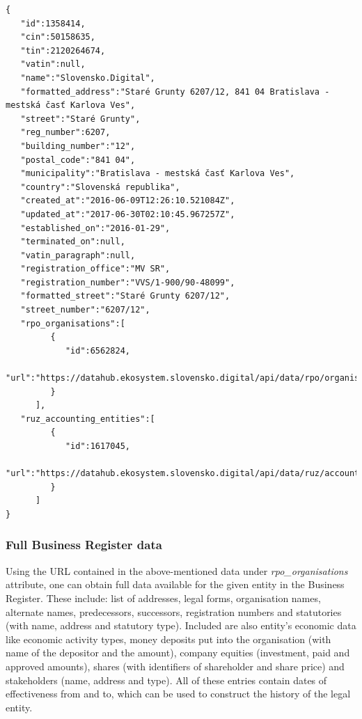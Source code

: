 \documentclass[thesis=B,english]{FITthesis}[2012/06/26]
\begin{document}
\begin{lstlisting}
{
   "id":1358414,
   "cin":50158635,
   "tin":2120264674,
   "vatin":null,
   "name":"Slovensko.Digital",
   "formatted_address":"Staré Grunty 6207/12, 841 04 Bratislava - mestská časť Karlova Ves",
   "street":"Staré Grunty",
   "reg_number":6207,
   "building_number":"12",
   "postal_code":"841 04",
   "municipality":"Bratislava - mestská časť Karlova Ves",
   "country":"Slovenská republika",
   "created_at":"2016-06-09T12:26:10.521084Z",
   "updated_at":"2017-06-30T02:10:45.967257Z",
   "established_on":"2016-01-29",
   "terminated_on":null,
   "vatin_paragraph":null,
   "registration_office":"MV SR",
   "registration_number":"VVS/1-900/90-48099",
   "formatted_street":"Staré Grunty 6207/12",
   "street_number":"6207/12",
   "rpo_organisations":[
         {
            "id":6562824,
            "url":"https://datahub.ekosystem.slovensko.digital/api/data/rpo/organisations/6562824"
         }
      ],
   "ruz_accounting_entities":[
         {
            "id":1617045,
            "url":"https://datahub.ekosystem.slovensko.digital/api/data/ruz/accounting_entities/1617045"
         }
      ]
}
\end{lstlisting}

\subsubsection{Full Business Register data}
	Using the URL contained in the above-mentioned data under \emph{rpo\_organisations} attribute, one can obtain full data available for the given entity in the Business Register. These include: list of addresses, legal forms, organisation names, alternate names, predecessors, successors, registration numbers and statutories (with name, address and statutory type). Included are also entity's economic data like economic activity types, money deposits put into the organisation (with name of the depositor and the amount), company equities (investment, paid and approved amounts), shares (with identifiers of shareholder and share price) and stakeholders (name, address and type). All of these entries contain dates of effectiveness from and to, which can be used to construct the history of the legal entity.
\end{document}
